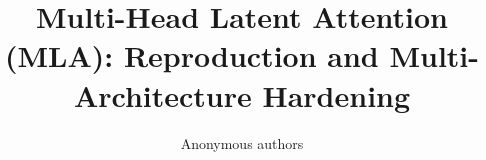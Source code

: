 \title{\textbf{Multi-Head Latent Attention (MLA): Reproduction and Multi-Architecture Hardening}}

\author{Anonymous authors}
